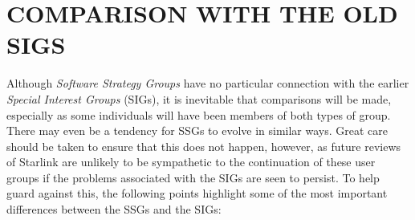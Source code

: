 \documentclass[twoside,11pt]{article}
\newcommand{\st}[1]{{\em{#1}}}
\begin{document}
\newpage
\appendix
\section{\label{sect:comparison}COMPARISON WITH THE OLD SIGS}

Although \st{Software Strategy Groups} have no particular connection
with the earlier \st{Special Interest Groups} (SIGs), it is inevitable
that comparisons will be made, especially as some individuals will
have been members of both types of group.  There may even be a
tendency for SSGs to evolve in similar ways. Great care should be
taken to ensure that this does not happen, however, as future reviews
of Starlink are unlikely to be sympathetic to the continuation of
these user groups if the problems associated with the SIGs are seen to
persist.  To help guard against this, the following points highlight
some of the most important differences between the SSGs and the SIGs:
\end{document}
